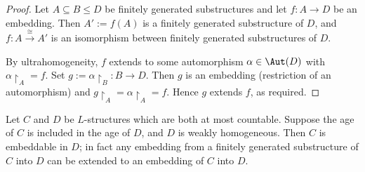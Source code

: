 \begin{proof}
    Let $A\subseteq B\le D$ be finitely generated substructures and let
    $f\colon A\to D$ be an embedding. Then $A':=f(A)$ is a finitely generated
    substructure of $D$, and $f\colon A\xrightarrow{\ \cong\ }A'$ is an
    isomorphism between finitely generated substructures of $D$.

    By ultrahomogeneity, $f$ extends to some automorphism
    $\alpha\in\Aut(D)$ with $\alpha\!\upharpoonright_A=f$.
    Set $g:=\alpha\!\upharpoonright_B\colon B\to D$. Then $g$ is an embedding
    (restriction of an automorphism) and $g\!\upharpoonright_A
        =\alpha\!\upharpoonright_A=f$. Hence $g$ extends $f$, as required.
\end{proof}


\begin{lemma}
    \label{lem:weakly-homogeneous-age-embedding}

    Let \( C \) and \( D \) be \( L \)-structures which are both at most countable. Suppose the age of \( C \) is included in the age of \( D \), and \( D \) is weakly homogeneous. Then \( C \) is embeddable in \( D \); in fact any embedding from a finitely generated substructure of \( C \) into \( D \) can be extended to an embedding of \( C \) into \( D \).
\end{lemma}


